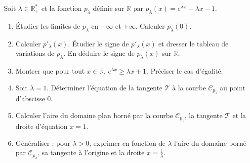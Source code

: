 \documentclass[11pt]{article}
\begin{document}
\begin{exercice}
Soit $\lambda \in \mathbb{R}^*_+$ et la fonction $p_\lambda$ définie sur $\mathbb{R}$ par $p_\lambda(x) = e^{\lambda x} - \lambda x - 1$.
\begin{enumerate}
    \item Étudier les limites de $p_\lambda$ en $-\infty$ et $+\infty$. Calculer $p_\lambda(0)$.
    \item Calculer $p'_\lambda(x)$. Étudier le signe de $p'_\lambda(x)$ et dresser le tableau de variations de $p_\lambda$. En déduire le signe de $p_\lambda(x)$ sur $\mathbb{R}$.
    \item Montrer que pour tout $x \in \mathbb{R}$, $e^{\lambda x} \geqslant \lambda x + 1$. Préciser le cas d'égalité.
    \item Soit $\lambda = 1$. Déterminer l'équation de la tangente $\mathcal{T}$ à la courbe $\mathcal{C}_{p_1}$ au point d'abscisse $0$.
    \item Calculer l'aire du domaine plan borné par la courbe $\mathcal{C}_{p_1}$, la tangente $\mathcal{T}$ et la droite d'équation $x = 1$.
    \item Généraliser : pour $\lambda > 0$, exprimer en fonction de $\lambda$ l'aire du domaine borné par $\mathcal{C}_{p_\lambda}$, sa tangente à l'origine et la droite $x = \frac{1}{\lambda}$.
\end{enumerate}
\end{exercice}
\end{document}
